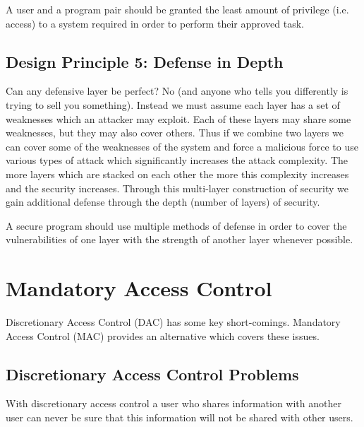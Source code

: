     \begin{keybox}
      A user and a program pair should be granted the least amount of privilege (i.e. access) to a system
        required in order to perform their approved task.
    \end{keybox}

  \subsection{Design Principle 5: Defense in Depth}
  \label{ssec:design_principle_5_defense_in_depth}

    Can any defensive layer be perfect?
    No (and anyone who tells you differently is trying to sell you something).
    Instead we must assume each layer has a set of weaknesses which an attacker may exploit.
    Each of these layers may share some weaknesses, but they may also cover others.
    Thus if we combine two layers we can cover some of the weaknesses of the system and force a malicious
      force to use various types of attack which significantly increases the attack complexity.
    The more layers which are stacked on each other the more this complexity increases and the security increases.
    Through this multi-layer construction of security we gain additional defense through the depth (number of layers)
      of security.

    \begin{keybox}
      A secure program should use multiple methods of defense in order to cover the vulnerabilities of one layer
        with the strength of another layer whenever possible.
    \end{keybox}

\section{Mandatory Access Control}
\label{sec:mandatory_access_control}

  Discretionary Access Control (DAC) has some key short-comings. 
  Mandatory Access Control (MAC) provides an alternative which covers these issues.

  \subsection{Discretionary Access Control Problems}
  \label{ssec:da_control_problem}

    With discretionary access control a user who shares information with another user can never be
      sure that this information will not be shared with other users.

